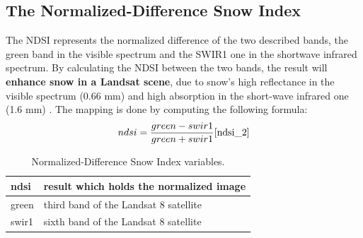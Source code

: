 \documentclass[12pt, a4paper]{report}
\begin{document}
	
	\subsection{The Normalized-Difference Snow Index}
	The NDSI represents the normalized difference of the two described bands, the green band in the visible spectrum and the SWIR1 one in the shortwave infrared spectrum. By calculating the NDSI between the two bands, the result will \textbf{enhance snow in a Landsat scene}, due to snow's high reflectance in the visible spectrum (0.66 mm) and high absorption in the short-wave infrared one (1.6 mm) \cite{ndsi_1, ndsi_2}. The mapping is done by computing the following formula:
	\[ndsi = \frac{green - swir1}{green + swir1}    \cite{ndsi_2}\]
	\begin{table} [H]
		\center
		\begin{tabular} {|  l | L{10cm} |}
			\hline
			ndsi & result which holds the normalized image \\ [0.2ex]
			\hline
			green & third band of the Landsat 8 satellite \\ [0.2ex]
			\hline
			swir1 & sixth band of the Landsat 8 satellite \\ [0.2ex]
			\hline
		\end{tabular}
		\caption{Normalized-Difference Snow Index variables.}
		\label{table:ndsi_table}
	\end{table}
	
\end{document}
